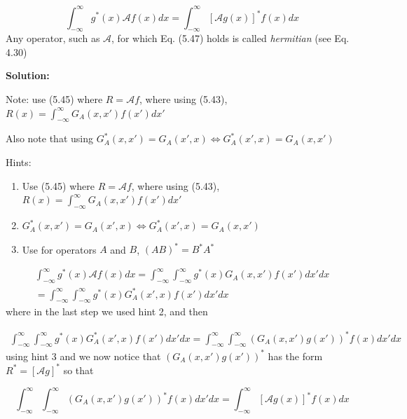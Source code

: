 \documentclass{article}
\begin{document}
\begin{equation*}
    \int_{-\infty}^{\infty}g^{*}(x) \mathcal{A}f(x)dx = \int_{-\infty}^{\infty} [\mathcal{A}g(x)]^{*}f(x)dx
\end{equation*}
Any operator, such as $\mathcal{A}$, for which Eq. (5.47) holds is called \textit{hermitian} (see Eq. 4.30)

\textbf{Solution:} 

Note: use (5.45) where $R = \mathcal{A}f$, where using (5.43), $R(x) = \int_{-\infty}^{\infty}G_{A}(x,x')f(x')dx'$

Also note that using $G^{*}_{A}(x,x') = G_{A}(x',x) \Leftrightarrow G^{*}_{A}(x',x) = G_{A}(x,x') $


Hints:
\begin{enumerate}
    \item Use (5.45) where $R = \mathcal{A}f$, where using (5.43), $R(x) = \int_{-\infty}^{\infty}G_{A}(x,x')f(x')dx'$
    \item $G^{*}_{A}(x,x') = G_{A}(x',x) \Leftrightarrow G^{*}_{A}(x',x) = G_{A}(x,x') $
    \item Use for operators $A$ and $B$, $(AB)^{*} = B^{*}A^{*}$
\end{enumerate}

\begin{multline*}
     \int_{-\infty}^{\infty}g^{*}(x) \mathcal{A}f(x)dx =  \int_{-\infty}^{\infty} \int_{-\infty}^{\infty}g^{*}(x)G_{A}(x,x')f(x')dx'dx \\
     = \int_{-\infty}^{\infty} \int_{-\infty}^{\infty}g^{*}(x)G^{*}_{A}(x',x)f(x')dx'dx
\end{multline*}
where in the last step we used hint 2, and then 

\begin{multline*}
    \int_{-\infty}^{\infty} \int_{-\infty}^{\infty}g^{*}(x)G^{*}_{A}(x',x)f(x')dx'dx =  \int_{-\infty}^{\infty} \int_{-\infty}^{\infty}(G_{A}(x,x')g(x'))^{*}f(x)dx'dx 
\end{multline*}
using hint 3 and we now notice that $(G_{A}(x,x')g(x'))^{*}$ has the form $R^{*} = [\mathcal{A}g]^{*}$ so that

\begin{equation*}
    \int_{-\infty}^{\infty} \int_{-\infty}^{\infty}(G_{A}(x,x')g(x'))^{*}f(x)dx'dx = \int_{-\infty}^{\infty}[\mathcal{A}g(x)]^{*}f(x)dx
\end{equation*}


\section{}
\end{document}
